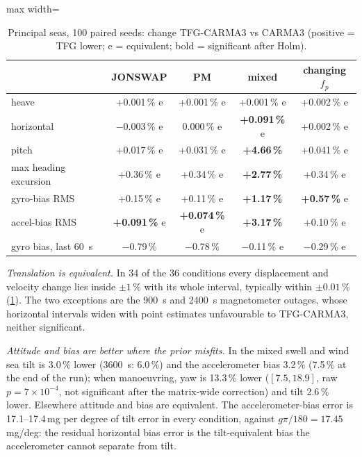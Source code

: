 \documentclass[conference]{IEEEtran}
\theoremstyle{bodysmall}
\begin{document}
\begin{table}[t]
  \centering
  \caption{Principal seas, 100 paired seeds: change TFG-CARMA3 vs CARMA3
    (positive = TFG lower; e = equivalent; bold = significant after Holm).}
  \label{tab:principal}
  \footnotesize
  \setlength{\tabcolsep}{2.5pt}
  \begin{adjustbox}{max width=\columnwidth}
  \begin{tabular}{@{}lcccc@{}}
    \toprule
    & JONSWAP & PM & mixed & changing $f_p$\\
    \midrule
    heave & +0.001\,\% e & +0.001\,\% e & +0.001\,\% e & +0.002\,\% e\\
    horizontal & $-$0.003\,\% e & 0.000\,\% e & \textbf{+0.091\,\%} e & +0.002\,\% e\\
    pitch & +0.017\,\% e & +0.031\,\% e & \textbf{+4.66\,\%} & +0.041\,\% e\\
    max heading excursion & +0.36\,\% e & +0.34\,\% e & \textbf{+2.77\,\%} & +0.34\,\% e\\
    gyro-bias RMS & +0.15\,\% e & +0.11\,\% e & \textbf{+1.17\,\%} & \textbf{+0.57\,\%} e\\
    accel-bias RMS & \textbf{+0.091\,\%} e & \textbf{+0.074\,\%} e & \textbf{+3.17\,\%} & +0.10\,\% e\\
    gyro bias, last \SI{60}{s} & $-$0.79\,\% & $-$0.78\,\% & $-$0.11\,\% e & $-$0.29\,\% e\\
    \bottomrule
  \end{tabular}
  \end{adjustbox}
\end{table}

\emph{Translation is equivalent.} In 34 of the 36 conditions every
displacement and velocity change lies inside $\pm1\,\%$ with its whole
interval, typically within $\pm0.01\,\%$ (\cref{tab:principal}). The two
exceptions are the \SI{900}{s} and \SI{2400}{s} magnetometer outages, whose
horizontal intervals widen with point estimates unfavourable to TFG-CARMA3,
neither significant.

\emph{Attitude and bias are better where the prior misfits.} In the mixed
swell and wind sea tilt is 3.0\,\% lower (\SI{3600}{s}: 6.0\,\%) and the
accelerometer bias 3.2\,\% (7.5\,\% at the end of the run); when manoeuvring,
yaw is 13.3\,\% lower ($[7.5,18.9]$, raw $p=7\times10^{-4}$, not significant
after the matrix-wide correction) and tilt 2.6\,\% lower. Elsewhere attitude
and bias are equivalent. The accelerometer-bias error is
17.1--17.4\,mg per degree of tilt error in every condition, against
$g\pi/180=17.45$\,mg/deg: the residual horizontal bias error is the
tilt-equivalent bias the accelerometer cannot separate from tilt.
\end{document}
